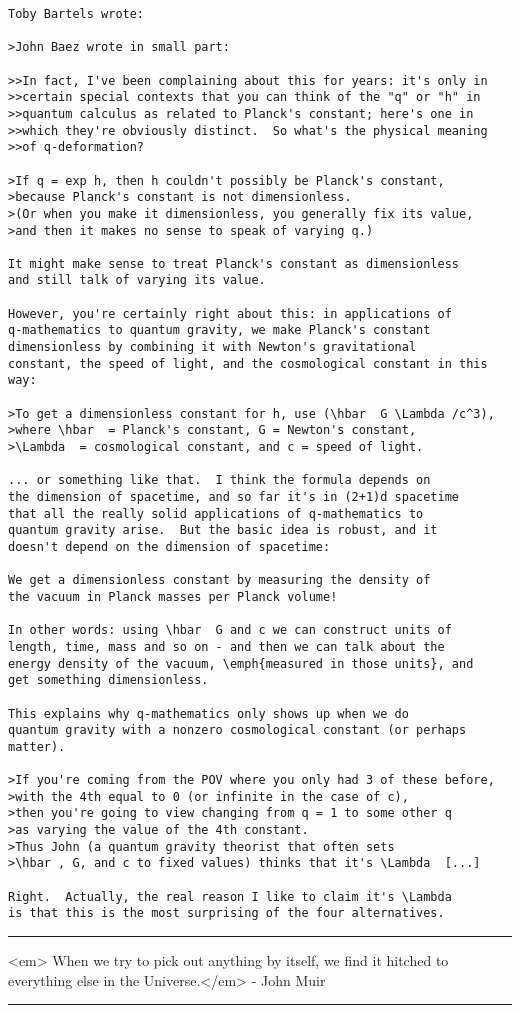 \begin{verbatim}



Toby Bartels wrote:

>John Baez wrote in small part:

>>In fact, I've been complaining about this for years: it's only in
>>certain special contexts that you can think of the "q" or "h" in
>>quantum calculus as related to Planck's constant; here's one in
>>which they're obviously distinct.  So what's the physical meaning
>>of q-deformation?

>If q = exp h, then h couldn't possibly be Planck's constant,
>because Planck's constant is not dimensionless.
>(Or when you make it dimensionless, you generally fix its value,
>and then it makes no sense to speak of varying q.)

It might make sense to treat Planck's constant as dimensionless 
and still talk of varying its value.  

However, you're certainly right about this: in applications of 
q-mathematics to quantum gravity, we make Planck's constant 
dimensionless by combining it with Newton's gravitational 
constant, the speed of light, and the cosmological constant in this way:

>To get a dimensionless constant for h, use (\hbar  G \Lambda /c^3),
>where \hbar  = Planck's constant, G = Newton's constant,
>\Lambda  = cosmological constant, and c = speed of light.

... or something like that.  I think the formula depends on 
the dimension of spacetime, and so far it's in (2+1)d spacetime
that all the really solid applications of q-mathematics to
quantum gravity arise.  But the basic idea is robust, and it
doesn't depend on the dimension of spacetime:

We get a dimensionless constant by measuring the density of
the vacuum in Planck masses per Planck volume!

In other words: using \hbar  G and c we can construct units of
length, time, mass and so on - and then we can talk about the
energy density of the vacuum, \emph{measured in those units}, and
get something dimensionless.

This explains why q-mathematics only shows up when we do 
quantum gravity with a nonzero cosmological constant (or perhaps
matter).

>If you're coming from the POV where you only had 3 of these before,
>with the 4th equal to 0 (or infinite in the case of c),
>then you're going to view changing from q = 1 to some other q
>as varying the value of the 4th constant.
>Thus John (a quantum gravity theorist that often sets
>\hbar , G, and c to fixed values) thinks that it's \Lambda  [...]

Right.  Actually, the real reason I like to claim it's \Lambda 
is that this is the most surprising of the four alternatives.

\end{verbatim}
    
\par\noindent\rule{\textwidth}{0.4pt}
<em> When we try to pick out anything by itself, we find it hitched 
to everything else in the Universe.</em> - John Muir

\par\noindent\rule{\textwidth}{0.4pt}

